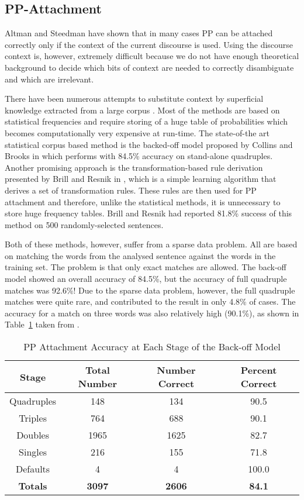 \subsection{PP-Attachment}

Altman and Steedman \cite{A&S88} have shown that in many cases \mbox{PP} can be attached correctly only if the context of the current discourse is used. Using the discourse context is, however, extremely difficult because we do not have enough theoretical background to decide which bits of context are needed to correctly disambiguate and which are irrelevant. 

There have been numerous attempts to substitute context by superficial knowledge extracted from a large corpus \cite{H&R93}. Most of the methods are based on statistical frequencies and require storing of a huge table of probabilities which becomes computationally very expensive at run-time. The state-of-the art statistical corpus based method is the backed-off model proposed by Collins and Brooks in \cite{CandB95} which performs with 84.5\% accuracy on stand-alone quadruples. Another promising approach is the transformation-based rule derivation presented by Brill and Resnik in \cite{BandR94}, which is a simple learning algorithm that derives a set of transformation rules. These rules are then used for PP attachment and therefore, unlike the statistical methods, it is unnecessary to store huge frequency tables. Brill and Resnik had reported 81.8\% success of this method on 500 randomly-selected sentences.

Both of these methods, however, suffer from a sparse data problem. All are based on matching the words from the analysed sentence against the words in the training set. The problem is that only exact matches are allowed. The back-off model showed an overall accuracy of 84.5\%, but the accuracy of full quadruple matches was 92.6\%! Due to the sparse data problem, however, the full quadruple matches were quite rare, and contributed to the result in only 4.8\% of cases. The accuracy for a match on three words was also relatively high (90.1\%), as shown in Table~\ref{tab:1} taken from \cite{CandB95}.

\begin{table}[t]
  \leavevmode
    \caption{PP Attachment Accuracy at Each Stage of the Back-off Model}
    \label{tab:1}
  \begin{center}
\begin{tabular}[c]{|c|c|c|c|}\hline
{\bf Stage} & {\bf Total Number} & {\bf Number Correct} & {\bf Percent Correct}\\\hline
Quadruples & 148 & 134 & 90.5\\\hline
Triples & 764 & 688 & 90.1\\\hline
Doubles & 1965 & 1625 & 82.7\\\hline
Singles & 216 & 155 & 71.8\\\hline
Defaults & 4 & 4 & 100.0\\\hline
{\bf Totals} & {\bf 3097} & {\bf 2606} & {\bf 84.1}\\\hline
\end{tabular}
\end{center}
\end{table}


